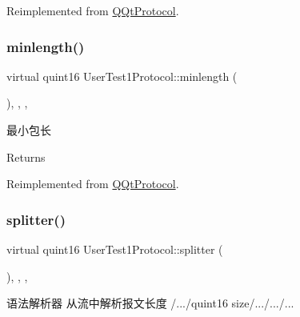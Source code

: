Reimplemented from \mbox{\hyperlink{class_q_qt_protocol_af41bc3116abbbcfc9af45e151a253ff7}{Q\+Qt\+Protocol}}.

\mbox{\label{class_user_test1_protocol_adb1008e781985acbb52a57b086f25871}} 
\subsubsection{\texorpdfstring{minlength()}{minlength()}}
{\footnotesize\ttfamily virtual quint16 User\+Test1\+Protocol\+::minlength (\begin{DoxyParamCaption}{ }\end{DoxyParamCaption})\hspace{0.3cm}{\ttfamily [inline]}, {\ttfamily [override]}, {\ttfamily [protected]}, {\ttfamily [virtual]}}



最小包长 

\begin{DoxyReturn}{Returns}

\end{DoxyReturn}


Reimplemented from \mbox{\hyperlink{class_q_qt_protocol_a2b00f53d3dd0eed817eeecff422891f3}{Q\+Qt\+Protocol}}.

\mbox{\label{class_user_test1_protocol_a393a4b16b21b40211541047cebb1ccfc}} 
\subsubsection{\texorpdfstring{splitter()}{splitter()}}
{\footnotesize\ttfamily virtual quint16 User\+Test1\+Protocol\+::splitter (\begin{DoxyParamCaption}\item[{const Q\+Byte\+Array \&}]{ }\end{DoxyParamCaption})\hspace{0.3cm}{\ttfamily [inline]}, {\ttfamily [override]}, {\ttfamily [protected]}, {\ttfamily [virtual]}}



语法解析器 从流中解析报文长度 /.../quint16 size/.../.../... 


